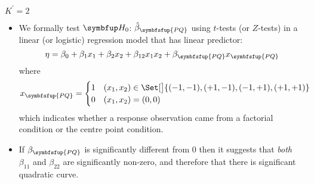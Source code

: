 \begin{Example}{$ K^\prime=2 $}{}
\begin{itemize}
\begin{itemize}[*]
                  \end{itemize}
            \item We formally test $ \HN $: $ \hat{\beta}_{\symbfsfup{PQ}} $ using $t$-tests (or $Z$-tests) in a linear (or logistic) regression model
                  that has linear predictor:
                  \[ \eta=\beta_0+\beta_1x_1+\beta_2x_2+\beta_{12}x_1x_2+\beta_{\symbfsfup{PQ}}x_{\symbfsfup{PQ}} \]
                  where
                  \[ x_{\symbfsfup{PQ}}=\begin{cases}
                              1 & (x_1,x_2)\in\Set[\big]{(-1,-1),(+1,-1),(-1,+1),(+1,+1)} \\
                              0 & (x_1,x_2)=(0,0)
                        \end{cases} \]
                  which indicates whether a response observation came from a factorial condition or the centre point condition.
            \item If $ \beta_{\symbfsfup{PQ}} $ is significantly different from 0 then it suggests that \emph{both} $ \beta_{11} $ and $ \beta_{22} $
                  are significantly non-zero, and therefore that there is significant quadratic curve.
      \end{itemize}
\end{Example}

